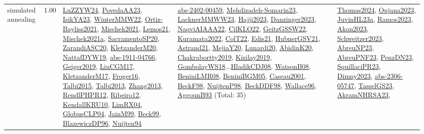 {\begin{longtable}{p{3cm}r>{\raggedright\arraybackslash}p{6cm}>{\raggedright\arraybackslash}p{6cm}>{\raggedright\arraybackslash}p{8cm}}
\index{simulated annealing}\index{Algorithms!simulated annealing}simulated annealing &  1.00 & \hyperref[detail:LuZZYW24]{LuZZYW24}, \hyperref[detail:PovedaAA23]{PovedaAA23}, \hyperref[detail:IsikYA23]{IsikYA23}, \hyperref[detail:WinterMMW22]{WinterMMW22}, \hyperref[detail:Ortiz-Bayliss2021]{Ortiz-Bayliss2021}, \hyperref[detail:Mischek2021]{Mischek2021}, \hyperref[detail:Lemos21]{Lemos21}, \hyperref[detail:Mischek2021a]{Mischek2021a}, \hyperref[detail:SacramentoSP20]{SacramentoSP20}, \hyperref[detail:ZarandiASC20]{ZarandiASC20}, \hyperref[detail:KletzanderM20]{KletzanderM20}, \hyperref[detail:NattafDYW19]{NattafDYW19}, \hyperref[detail:abs-1911-04766]{abs-1911-04766}, \hyperref[detail:Geiger2019]{Geiger2019}, \hyperref[detail:LiuCGM17]{LiuCGM17}, \hyperref[detail:KletzanderM17]{KletzanderM17}, \hyperref[detail:Froger16]{Froger16}, \hyperref[detail:Talbi2015]{Talbi2015}, \hyperref[detail:Talbi2013]{Talbi2013}, \hyperref[detail:Zhang2013]{Zhang2013}, \hyperref[detail:RendlPHPR12]{RendlPHPR12}, \hyperref[detail:Ribeiro12]{Ribeiro12}, \hyperref[detail:KendallKRU10]{KendallKRU10}, \hyperref[detail:LimRX04]{LimRX04}, \hyperref[detail:GlobusCLP04]{GlobusCLP04}, \hyperref[detail:JainM99]{JainM99}, \hyperref[detail:Beck99]{Beck99}, \hyperref[detail:BlazewiczDP96]{BlazewiczDP96}, \hyperref[detail:Nuijten94]{Nuijten94} & \hyperref[detail:abs-2402-00459]{abs-2402-00459}, \hyperref[detail:Mehdizadeh-Somarin23]{Mehdizadeh-Somarin23}, \hyperref[detail:LacknerMMWW23]{LacknerMMWW23}, \hyperref[detail:Hajji2023]{Hajji2023}, \hyperref[detail:Danzinger2023]{Danzinger2023}, \hyperref[detail:NaqviAIAAA22]{NaqviAIAAA22}, \hyperref[detail:CilKLO22]{CilKLO22}, \hyperref[detail:GeitzGSSW22]{GeitzGSSW22}, \hyperref[detail:Kuramata2022]{Kuramata2022}, \hyperref[detail:ColT22]{ColT22}, \hyperref[detail:Edis21]{Edis21}, \hyperref[detail:HubnerGSV21]{HubnerGSV21}, \hyperref[detail:Astrand21]{Astrand21}, \hyperref[detail:MejiaY20]{MejiaY20}, \hyperref[detail:Lunardi20]{Lunardi20}, \hyperref[detail:AbidinK20]{AbidinK20}, \hyperref[detail:Chakrabortty2019]{Chakrabortty2019}, \hyperref[detail:Kizilay2019]{Kizilay2019}, \hyperref[detail:GombolayWS18]{GombolayWS18}...\hyperref[detail:HladikCDJ08]{HladikCDJ08}, \hyperref[detail:WatsonB08]{WatsonB08}, \hyperref[detail:BeniniLMR08]{BeniniLMR08}, \hyperref[detail:BeniniBGM05]{BeniniBGM05}, \hyperref[detail:Caseau2001]{Caseau2001}, \hyperref[detail:BeckF98]{BeckF98}, \hyperref[detail:NuijtenP98]{NuijtenP98}, \hyperref[detail:BeckDDF98]{BeckDDF98}, \hyperref[detail:Wallace96]{Wallace96}, \hyperref[detail:AggounB93]{AggounB93} (Total: 35) & \hyperref[detail:Thomas2024]{Thomas2024}, \hyperref[detail:Oujana2023]{Oujana2023}, \hyperref[detail:JuvinHL23a]{JuvinHL23a}, \hyperref[detail:Ramos2023]{Ramos2023}, \hyperref[detail:Akan2023]{Akan2023}, \hyperref[detail:Schweitzer2023]{Schweitzer2023}, \hyperref[detail:AbreuNP23]{AbreuNP23}, \hyperref[detail:AbreuPNF23]{AbreuPNF23}, \hyperref[detail:PenzDN23]{PenzDN23}, \hyperref[detail:SquillaciPR23]{SquillaciPR23}, \hyperref[detail:Dimny2023]{Dimny2023}, \hyperref[detail:abs-2306-05747]{abs-2306-05747}, \hyperref[detail:TasselGS23]{TasselGS23}, \hyperref[detail:AkramNHRSA23]{AkramNHRSA23}, 
\end{longtable}}
